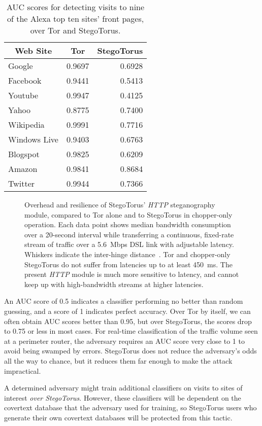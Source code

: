 \begin{table}[ht]
\centering\footnotesize
\begin{tabular}{lrr}
\toprule
\multicolumn{1}{c}{\textbf{Web Site}} &
\multicolumn{1}{c}{\textbf{Tor}} &
\multicolumn{1}{c}{\textbf{StegoTorus}} \\
\midrule
Google          & 0.9697     & 0.6928 \\
Facebook        & 0.9441     & 0.5413 \\
Youtube         & 0.9947     & 0.4125 \\
Yahoo           & 0.8775     & 0.7400 \\
Wikipedia       & 0.9991     & 0.7716 \\
Windows Live    & 0.9403     & 0.6763 \\
Blogspot        & 0.9825     & 0.6209 \\
Amazon          & 0.9841     & 0.8684 \\
Twitter         & 0.9944     & 0.7366 \\
\bottomrule
\end{tabular}
\caption{AUC scores for detecting visits to nine of the Alexa top ten
  sites' front pages, over Tor and StegoTorus.}
\label{t:eval-auc}
\end{table}

\begin{figure*}
\centering

\caption{Overhead and resilience of StegoTorus' \textit{HTTP}
  steganography module, compared to Tor alone and to StegoTorus in
  chopper-only operation.  Each data point shows median bandwidth
  consumption over a 20-second interval while transferring a
  continuous, fixed-rate stream of traffic over a 5.6~Mbps DSL link
  with adjustable latency.  Whiskers indicate the inter-hinge
  distance~\cite{s-boxplot}.  Tor and chopper-only StegoTorus do not
  suffer from latencies up to at least 450~ms.  The present
  \textit{HTTP} module is much more sensitive to latency, and cannot
  keep up with high-bandwidth streams at higher
  latencies.}\label{f:resilience}
\end{figure*}

An AUC score of 0.5 indicates a classifier performing no better than
random guessing, and a score of 1 indicates perfect accuracy.
Over Tor by itself, we can often obtain AUC scores better than 0.95,
but over StegoTorus, the scores drop to 0.75 or less in most cases.
For real-time classification of the traffic volume seen at a perimeter
router, the adversary requires an AUC score very close to 1 to avoid
being swamped by errors.  StegoTorus does not reduce the adversary's
odds all the way to chance, but it reduces them far enough to make the
attack impractical.

A determined adversary might train additional classifiers on visits to
sites of interest \emph{over StegoTorus}.  However, these classifiers
will be dependent on the covertext database that the adversary used
for training, so StegoTorus users who generate their own covertext
databases will be protected from this tactic.
